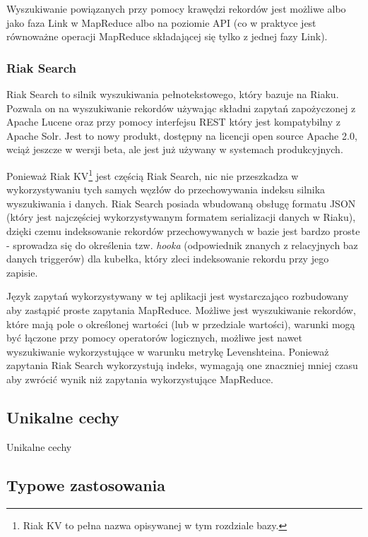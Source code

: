 Wyszukiwanie powiązanych przy pomocy krawędzi rekordów jest możliwe albo jako faza Link w MapReduce albo na poziomie API (co w praktyce jest równoważne operacji MapReduce składającej się tylko z jednej fazy Link).

\subsubsection*{Riak Search}

Riak Search to silnik wyszukiwania pełnotekstowego, który bazuje na Riaku. 
Pozwala on na wyszukiwanie rekordów używając składni zapytań zapożyczonej z Apache Lucene oraz przy pomocy interfejsu REST który jest kompatybilny z Apache Solr.
Jest to nowy produkt, dostępny na licencji open source Apache 2.0, wciąż jeszcze w wersji beta, ale jest już używany w systemach produkcyjnych.

Ponieważ Riak KV\footnote{Riak KV to pełna nazwa opisywanej w tym rozdziale bazy.} jest częścią Riak Search, nic nie przeszkadza w wykorzystywaniu tych samych węzłów do przechowywania indeksu silnika wyszukiwania i danych.
Riak Search posiada wbudowaną obsługę formatu JSON (który jest najczęściej wykorzystywanym formatem serializacji danych w Riaku), dzięki czemu indeksowanie rekordów przechowywanych w bazie jest bardzo proste - sprowadza się do określenia tzw. \emph{hooka} (odpowiednik znanych z relacyjnych baz danych triggerów) dla kubełka, który zleci indeksowanie rekordu przy jego zapisie.

Język zapytań wykorzystywany w tej aplikacji jest wystarczająco rozbudowany aby zastąpić proste zapytania MapReduce.
Możliwe jest wyszukiwanie rekordów, które mają pole o określonej wartości (lub w przedziale wartości), warunki mogą być łączone przy pomocy operatorów logicznych, możliwe jest nawet wyszukiwanie wykorzystujące w warunku metrykę Levenshteina.
Ponieważ zapytania Riak Search wykorzystują indeks, wymagają one znaczniej mniej czasu aby zwrócić wynik niż zapytania wykorzystujące MapReduce.

\subsection*{Unikalne cechy}

Unikalne cechy

\subsection*{Typowe zastosowania}

